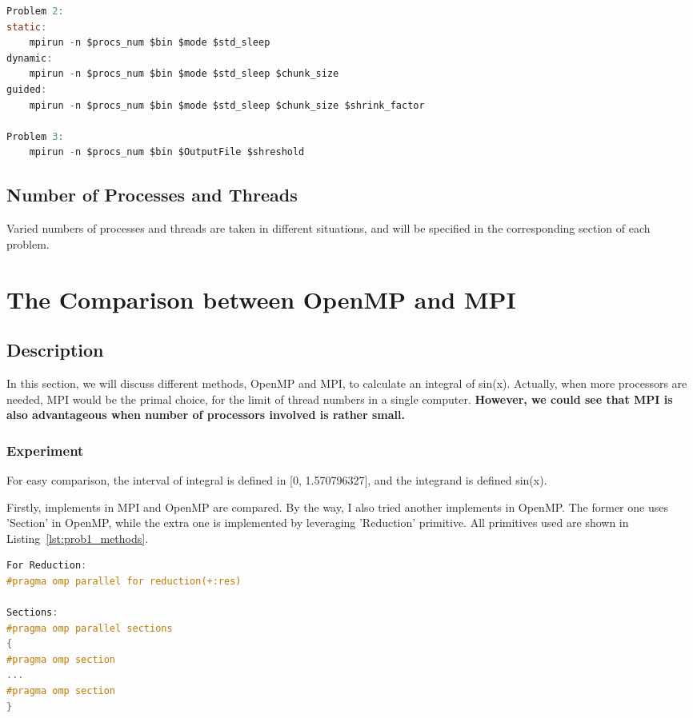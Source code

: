 \documentclass[a4paper]{article}   %
\begin{document}
\begin{CJK}{UTF8}{gbsn}
\begin{spacing}{1.2}
\begin{lstlisting}[language=C, label=lst:makefile, caption=Makefile Command]
Problem 2:
static:
	mpirun -n $procs_num $bin $mode $std_sleep
dynamic: 
	mpirun -n $procs_num $bin $mode $std_sleep $chunk_size
guided: 
	mpirun -n $procs_num $bin $mode $std_sleep $chunk_size $shrink_factor

Problem 3:
	mpirun -n $procs_num $bin $OutputFile $shreshold

\end{lstlisting}

\subsection{Number of Processes and Threads}
Varied numbers of processes and threads are taken in different situations, and will be specified in the corresponding section of each problem. 

\section{The Comparison between OpenMP and MPI}
\subsection{Description}
In this section, we will discuss different methods, OpenMP and MPI, to calculate an integral of sin(x). Actually, when more processors are needed, MPI would be the primal choice, for the limit of thread numbers in a single computer. \textbf{However, we could see that MPI is also advantageous when number of processors involved is rather small.}

\subsubsection{Experiment}
For easy comparison, the interval of integral is defined in [0, 1.570796327], and the integrand is defined sin(x). 

Firstly, implements in MPI and OpenMP are compared. By the way, I also tried another implements in OpenMP. The former one uses 'Section' in OpenMP, while the extra one is implemented by leveraging 'Reduction' primitive. All primitives used are shown in Listing~\ref{lst:prob1_methods}.

\begin{lstlisting}[language=C, label=lst:prob1_methods, caption=Different Implements of OpenMP]
For Reduction:
#pragma omp parallel for reduction(+:res)

Sections:
#pragma omp parallel sections
{
#pragma omp section
...
#pragma omp section
}
\end{lstlisting}

\end{spacing}
\end{CJK}
\end{document}

